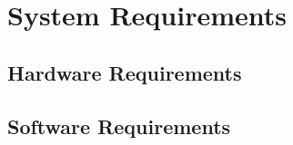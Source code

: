 \section{System Requirements}

\subsection{Hardware Requirements}
\subsection{Software Requirements}
